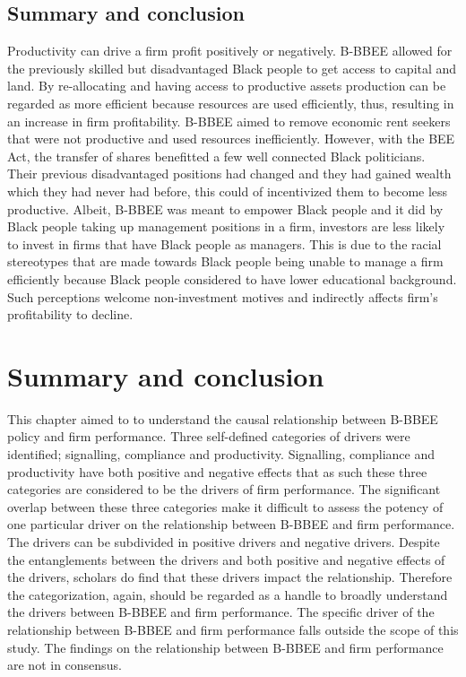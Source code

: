 \subsection{Summary and conclusion}
Productivity can drive a firm profit positively or negatively. B-BBEE allowed for the previously skilled but disadvantaged Black people to get access to capital and land. By re-allocating and having access to productive assets production can be regarded as more efficient because resources are used efficiently, thus, resulting in an increase in firm profitability. B-BBEE aimed to remove economic rent seekers that were not productive and used resources inefficiently. However, with the BEE Act, the transfer of shares benefitted a few well connected Black politicians. Their previous disadvantaged positions had changed and they had gained wealth which they had never had before, this could of incentivized them to become less productive. Albeit, B-BBEE was meant to empower Black people and it did by Black people taking up management positions in a firm, investors are less likely to invest in firms that have Black people as managers. This is due to the racial stereotypes that are made towards Black people being unable to manage a firm efficiently because Black people considered to have lower educational background. Such perceptions welcome non-investment motives and indirectly affects firm's profitability to decline.
\section{Summary and conclusion}
This chapter aimed to to understand the causal relationship between B-BBEE policy and firm performance. Three self-defined categories of drivers were identified; signalling, compliance and productivity. Signalling, compliance and productivity have both positive and negative effects that as such these three categories are considered to be the drivers of firm performance. The significant overlap between these three categories make it difficult to assess the potency of one particular driver on the relationship between B-BBEE and firm performance. The drivers can be subdivided in positive drivers and negative drivers. Despite the entanglements between the drivers and both positive and negative effects of the drivers, scholars do find that these drivers impact the relationship. Therefore the categorization, again, should be regarded as a handle to broadly understand the drivers between B-BBEE and firm performance. The specific driver of the relationship between B-BBEE and firm performance falls outside the scope of this study. The findings on the relationship between B-BBEE and firm performance are not in consensus.

